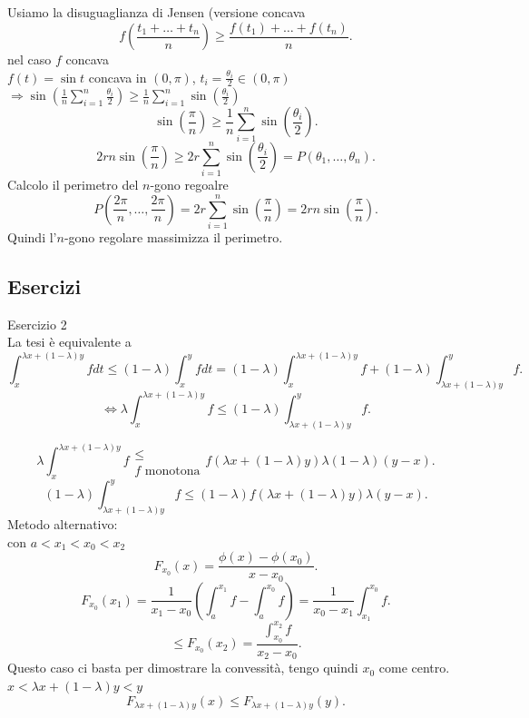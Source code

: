 \documentclass[12px]{article}
\begin{document}
Usiamo la disuguaglianza di Jensen (versione concava
\[
	f \left(\frac{t_1 + \ldots + t_n} n \right) \geq \frac{f(t_1) + \ldots + f(t_n)} n .\] 
	nel caso $f$ concava\\
	$f(t) = \sin t$ concava in  $(0,\pi)$,  $t_i = \frac{\theta_i}2\in(0,\pi)$\\
	$ \Rightarrow  \sin \left(\frac 1 n \sum^{n}_{i=1}\frac{\theta_i}{2} \right)\geq \frac 1n \sum^{n}_{i=1}\sin \left(\frac{\theta_i}2 \right)$ 
	\[
		\sin \left(\frac \pi n \right)\geq \frac 1n \sum^{n}_{i=1}\sin \left(\frac {\theta_i}2 \right)
	.\] 
	\[
		2rn\sin \left(\frac \pi n \right)\geq 2r \sum^{ n}_{i=1} \sin \left(\frac{\theta_i} 2 \right) = P(\theta_1,\ldots,\theta_n)
	.\] 
	Calcolo il perimetro del $n$-gono regoalre
	\[
		P \left(\frac {2\pi}n,\ldots,\frac{2\pi}n \right) = 2r \sum^{n}_{i=1}\sin \left( \frac\pi n \right)  = 2 r n \sin \left(\frac \pi n \right)
	.\] 
	Quindi l'$n$-gono regolare massimizza il perimetro.\\
	\subsection{Esercizi}
	Esercizio 2\\
	La tesi è equivalente a
	\[
		\int_x^{\lambda x + (1-\lambda)y}f dt \leq (1- \lambda)\int_x^y f dt = (1- \lambda) \int_x^{ \lambda x + (1 - \lambda)y}f + (1- \lambda)\int_{ \lambda x + (1- \lambda)y}^y f
	.\] 
	\[
		\Leftrightarrow \lambda\int_x^{ \lambda x + (1- \lambda) y }f  \leq (1- \lambda) \int_{ \lambda x + (1- \lambda) y}^y f
	.\] 

	\[
		\lambda\int_{x}^{ \lambda x + (1- \lambda)y}f\substack{\leq\\ f \text{ monotona}} f({ \lambda x + (1- \lambda)y}) \lambda (1- \lambda)(y-x)
	.\] 
	\[
		(1 - \lambda) \int^y_{ \lambda x + (1- \lambda)y} f \leq (1- \lambda) f({ \lambda x + (1- \lambda)y}) \lambda (y-x)
	.\] 
	Metodo alternativo:\\
	con $a < x_1 < x_0 < x_2$
	\[
		F_{x_0}(x) = \frac{\phi(x)-\phi(x_0)}{x-x_0}
	.\] 
	\[
		F_{x_0}(x_1) = \frac{1}{x_1-x_0} \left( \int_a^{x_1}f- \int_a^{x_0} f\right) = \frac {1}{x_0-x_1}\int_{x_1}^{x_0}f
	.\] 
	\[
		\leq F_{x_0}(x_2) = \frac{\int_{x_0}^{x_2}f}{x_2-x_0}
	.\] 
	Questo caso ci basta per dimostrare la convessità, tengo quindi $ x_0$ come centro.\\
	$x < \lambda x+ (1- \lambda) y < y$\\
	\[
		F_{ \lambda x + (1- \lambda)y}(x)\leq F_{ \lambda x + (1- \lambda ) y}(y)
	.\]
\end{document}
